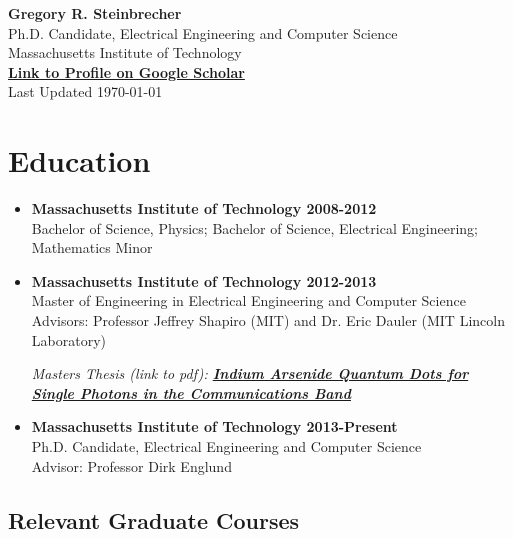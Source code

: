 \documentclass[letterpaper,12pt]{article}
\begin{document}
\begin{center}
{\huge \textbf{Gregory R. Steinbrecher}}\\
\vspace{5mm}
{\normalsize Ph.D. Candidate, Electrical Engineering and Computer Science\\
Massachusetts Institute of Technology}\\

{\small \href{https://scholar.google.com/citations?user=RPAnJ3cAAAAJ}{\textbf{Link to Profile on Google Scholar}}}\\
\vspace{5mm}
{\small Last Updated \today}\\
\end{center}

\section{Education}

\begin{itemize}

\item \textbf{Massachusetts Institute of Technology 2008-2012}\\
Bachelor of Science, Physics; Bachelor of Science, Electrical Engineering; Mathematics Minor

\item \textbf{Massachusetts Institute of Technology 2012-2013}\\
Master of Engineering in Electrical Engineering and Computer Science\\
Advisors: Professor Jeffrey Shapiro (MIT) and Dr. Eric Dauler (MIT Lincoln Laboratory)

\vspace{0.5em}

{\small \emph{Masters Thesis (link to pdf): \href{http://web.mit.edu/gstein/www/steinbrecher-meng-thesis.pdf}{\textbf{Indium Arsenide Quantum Dots for Single Photons in the Communications Band}}}}

\item \textbf{Massachusetts Institute of Technology 2013-Present}\\
Ph.D. Candidate, Electrical Engineering and Computer Science\\
Advisor: Professor Dirk Englund

\end{itemize}

\subsection{Relevant Graduate Courses}
\end{document}
